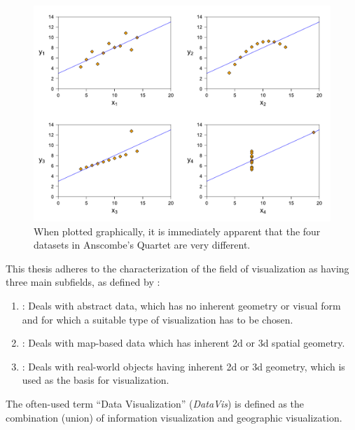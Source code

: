 \begin{figure}[tp]
\centering
\includegraphics[keepaspectratio,width=\linewidth,height=\halfh]
{diagrams/anscombe.pdf}
\caption[Anscombe's Quartet]{
When plotted graphically, it is immediately apparent that
the four datasets in Anscombe's Quartet are very different.
}
\label{fig:AnscombePlot}
\end{figure}







This thesis adheres to the characterization of the field of
visualization as having three main subfields, as defined by
\textcite{IVISCourseNotes}:
\begin{enumerate}
\item {}: Deals with
  abstract data, which has no inherent geometry or visual form and for
  which a suitable type of visualization has to be chosen.

\item {}: Deals with
  map-based data which has inherent 2d or 3d spatial geometry.

\item {}: Deals with
  real-world objects having inherent 2d or 3d geometry, which
  is used as the basis for visualization.
\end{enumerate}
The often-used term \enquote{Data Visualization} (\emph{DataVis}) is
defined as the combination (union) of information visualization and
geographic visualization.


